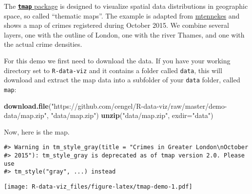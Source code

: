 \documentclass[]{book}
\newenvironment{Shaded}{\begin{snugshade}}{\end{snugshade}}
\newcommand{\DataTypeTok}[1]{\textcolor[rgb]{0.13,0.29,0.53}{#1}}
\newcommand{\KeywordTok}[1]{\textcolor[rgb]{0.13,0.29,0.53}{\textbf{#1}}}
\newcommand{\NormalTok}[1]{#1}
\newcommand{\StringTok}[1]{\textcolor[rgb]{0.31,0.60,0.02}{#1}}
\begin{document}
The \href{https://CRAN.R-project.org/package=tmap}{\textbf{\texttt{tmap}} package} is designed to visualize spatial data distributions in geographic space, so called ``thematic maps''. The example is adapted from \href{https://github.com/mtennekes/tmap/tree/master/demo/LondonCrimes}{mtennekes} and shows a map of crimes registered during October 2015. We combine several layers, one with the outline of London, one with the river Thames, and one with the actual crime densities.

For this demo we first need to download the data. If you have your working directory set to \texttt{R-data-viz} and it contains a folder called \texttt{data}, this will download and extract the map data into a subfolder of your \texttt{data} folder, called \texttt{map}:

\begin{Shaded}
\begin{Highlighting}[]
\KeywordTok{download.file}\NormalTok{(}\StringTok{"https://github.com/cengel/R-data-viz/raw/master/demo-data/map.zip"}\NormalTok{,}
              \StringTok{"data/map.zip"}\NormalTok{)}
\KeywordTok{unzip}\NormalTok{(}\StringTok{"data/map.zip"}\NormalTok{, }\DataTypeTok{exdir=}\StringTok{"data"}\NormalTok{)}
\end{Highlighting}
\end{Shaded}

Now, here is the map.

\begin{verbatim}
#> Warning in tm_style_gray(title = "Crimes in Greater London\nOctober
#> 2015"): tm_style_gray is deprecated as of tmap version 2.0. Please use
#> tm_style("gray", ...) instead
\end{verbatim}

\texttt{[image: R-data-viz\_files/figure-latex/tmap-demo-1.pdf]}
\end{document}
